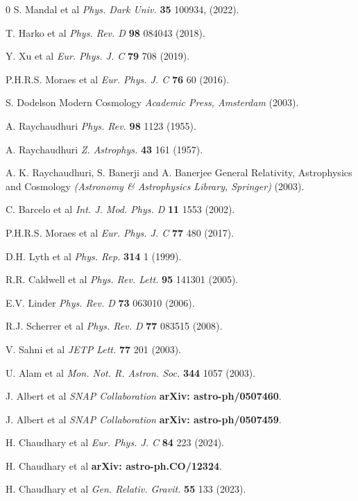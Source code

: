 \documentclass[aps,prd,showpacs,nofootinbib,floats,floatfix,preprintnumbers,groupedaddress,twocolumn]{revtex4-1}
\begin{document}
\begin{thebibliography}{0}
S. Mandal et al \textit{Phys. Dark Univ.} \textbf{35} 100934, (2022).

T. Harko et al \textit{Phys. Rev. D} \textbf{98} 084043 (2018).

 Y. Xu et al \textit{Eur. Phys. J. C} \textbf{79} 708 (2019).

P.H.R.S. Moraes et al \textit{Eur. Phys. J. C} \textbf{76} 60 (2016).

S. Dodelson Modern Cosmology \textit{Academic Press, Amsterdam} (2003).

A. Raychaudhuri \textit{Phys. Rev.} \textbf{98} 1123 (1955).

A. Raychaudhuri \textit{Z. Astrophys.} \textbf{43} 161 (1957).

A. K. Raychaudhuri, S. Banerji and A. Banerjee General Relativity,
Astrophysics and Cosmology \textit{(Astronomy \& Astrophysics Library, Springer)} (2003).

C. Barcelo et al \textit{Int. J. Mod. Phys. D} \textbf{11} 1553 (2002).

P.H.R.S. Moraes et al \textit{Eur. Phys. J. C} \textbf{77} 480 (2017).

D.H. Lyth et al \textit{Phys. Rep.} \textbf{314} 1 (1999).

R.R. Caldwell et al \textit{Phys. Rev. Lett.} \textbf{95} 141301 (2005). 

E.V. Linder \textit{Phys. Rev. D} \textbf{73} 063010 (2006). 

R.J. Scherrer et al \textit{Phys. Rev. D} \textbf{77} 083515 (2008).

V. Sahni et al \textit{JETP Lett.} \textbf{77} 201 (2003).

U. Alam et al \textit{Mon. Not. R. Astron. Soc.} \textbf{344} 1057 (2003).

J. Albert et al \textit{SNAP Collaboration} \textbf{arXiv: astro-ph/0507460}.

J. Albert et al \textit{SNAP Collaboration} \textbf{arXiv: astro-ph/0507459}.

 H. Chaudhary et al \textit{Eur. Phys. J. C} \textbf{84} 223 (2024).

 H. Chaudhary et al \textbf{arXiv: astro-ph.CO/12324}.

 H. Chaudhary et al \textit{Gen. Relativ. Gravit.} \textbf{55} 133 (2023).


\end{thebibliography}
\end{document}
